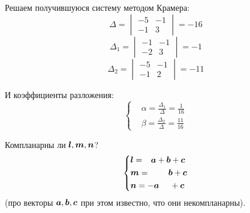 \documentclass[a4paper,12pt]{article}
\begin{document}
\begin{solution}
    Решаем получившуюся систему методом Крамера:
    \[
      \Delta = \begin{vmatrix}
        -5 & -1\\
        -1 & 3
      \end{vmatrix} = -16
    \]
    \[
      \Delta_1 = \begin{vmatrix}
        -1 & -1\\
        -2 & 3
      \end{vmatrix} = -1
    \]
    \[
      \Delta_2 = \begin{vmatrix}
        -5 & -1\\
        -1 & 2
      \end{vmatrix} = -11
    \]
    
    И коэффициенты разложения:
    \[
      \left\{
        \begin{aligned}
          &\alpha = \frac{\Delta_1}{\Delta} = \frac{1}{16}\\
          &\beta = \frac{\Delta_2}{\Delta} = \frac{11}{16}
        \end{aligned}
      \right.
    \]
  \end{solution}
  

  \begin{problem}[1.11(1)]
    Компланарны ли $\boldsymbol l, \boldsymbol m, \boldsymbol n$?
    \begin{equation}
      \label{eq:problem1.11}
      \left\{
        \begin{aligned}
          &\bds l = \hphantom{-}\bds a + \bds b + \bds c\\
          &\bds m = \hphantom{-\bds a +} \bds b + \bds c\\  %
          &\bds n = -\bds a \hphantom{+ \bds b} + \bds c
        \end{aligned}
      \right.
    \end{equation}
    (про векторы $\boldsymbol a, \boldsymbol b, \boldsymbol c$ при этом известно, что они некомпланарны).
  \end{problem}
  
\end{document}
